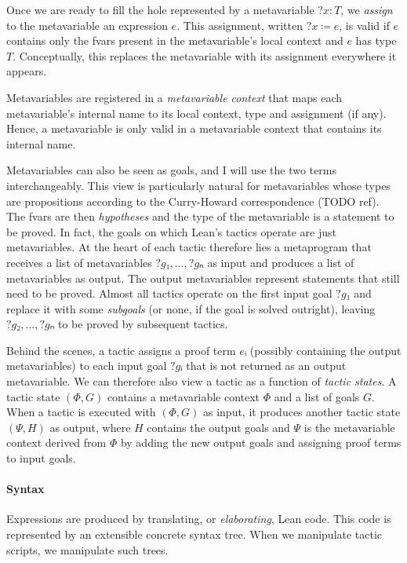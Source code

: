 \documentclass[sigplan,10pt,anonymous,review]{acmart}
\newcommand{\mvar}[1]{{?#1}}
\begin{document}
Once we are ready to fill the hole represented by a metavariable $\mvar{x} : T$, we \emph{assign} to the metavariable an expression $e$.
This assignment, written $\mvar{x} ≔ e$, is valid if $e$ contains only the fvars present in the metavariable's local context and $e$ has type $T$.
Conceptually, this replaces the metavariable with its assignment everywhere it appears.

Metavariables are registered in a \emph{metavariable context} that maps each metavariable's internal name to its local context, type and assignment (if any).
Hence, a metavariable is only valid in a metavariable context that contains its internal name.

Metavariables can also be seen as goals, and I will use the two terms interchangeably.
This view is particularly natural for metavariables whose types are propositions according to the Curry-Howard correspondence (TODO ref).
The fvars are then \emph{hypotheses} and the type of the metavariable is a statement to be proved.
In fact, the goals on which Lean's tactics operate are just metavariables.
At the heart of each tactic therefore lies a metaprogram that receives a list of metavariables $\mvar{g₁}, \dots, \mvar{gₙ}$ as input and produces a list of metavariables as output.
The output metavariables represent statements that still need to be proved.
Almost all tactics operate on the first input goal $\mvar{g₁}$ and replace it with some \emph{subgoals} (or none, if the goal is solved outright), leaving $\mvar{g₂}, \dots, \mvar{gₙ}$ to be proved by subsequent tactics.

Behind the scenes, a tactic assigns a proof term $eᵢ$ (possibly containing the output metavariables) to each input goal $\mvar{gᵢ}$ that is not returned as an output metavariable.
We can therefore also view a tactic as a function of \emph{tactic states}.
A tactic state $(Φ, G)$ contains a metavariable context $Φ$ and a list of goals $G$.
When a tactic is executed with $(Φ, G)$ as input, it produces another tactic state $(Ψ, H)$ as output, where $H$ contains the output goals and $Ψ$ is the metavariable context derived from $Φ$ by adding the new output goals and assigning proof terms to input goals.

\paragraph{Syntax}
Expressions are produced by translating, or \emph{elaborating}, Lean code.
This code is represented by an extensible concrete syntax tree.
When we manipulate tactic scripts, we manipulate such trees.
\end{document}
